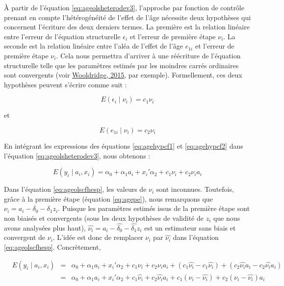 \documentclass[
]{book}
\begin{document}
À partir de l'équation \eqref{eq:ageolsheterodev3}, l'approche par fonction de contrôle prenant en compte l'hétérogénéité de l'effet de l'âge nécessite deux hypothèses qui concernent l'écriture des deux derniers termes. La première est la relation linéaire entre l'erreur de l'équation structurelle \(\epsilon_i\) et l'erreur de première étape \(\nu_i\). La seconde est la relation linéaire entre l'aléa de l'effet de l'âge \(e_{1i}\) et l'erreur de première étape \(\nu_i\). Cela nous permettra d'arriver à une réécriture de l'équation structurelle telle que les paramètres estimés par les moindres carrés ordinaires sont convergents (voir \protect\hyperlink{ref-WOO:15}{Wooldridge, 2015}, par exemple). Formellement, ces deux hypothèses peuvent s'écrire comme suit :

\begin{equation} 
\label{eq:agehypcf1}
E(\epsilon_i \mid \nu_i) = c_1 \nu_i
\end{equation}

et

\begin{equation}
\label{eq:agehypcf2}
E(e_{1i} \mid \nu_i) = c_2 \nu_i
\end{equation}

En intégrant les expressions des équations \eqref{eq:agehypcf1} et \eqref{eq:agehypcf2} dans l'équation \eqref{eq:ageolsheterodev3}, nous obtenons :

\begin{equation}
\label{eq:ageolscfhesp}
E(y_i \mid a_i, x_i) = \alpha_0 + \alpha_1 a_i + x_i' \alpha_2 + c_1 \nu_i + c_2 \nu_i a_i
\end{equation}

Dans l'équation \eqref{eq:ageolscfhesp}, les valeurs de \(\nu_i\) sont inconnues. Toutefois, grâce à la première étape (équation \ref{eq:agepe}), nous remarquons que \(\nu_i = a_i - \delta_0 - \delta_1 z_i\). Puisque les paramètres estimés issus de la première étape sont non biaisés et convergents (sous les deux hypothèses de validité de \(z_i\) que nous avons analysées plus haut), \(\hat{\nu_i} = a_i - \hat{\delta_0} - \hat{\delta_1} z_i\) est un estimateur sans biais et convergent de \(\nu_i\). L'idée est donc de remplacer \(\nu_i\) par \(\hat{\nu_i}\) dans l'équation \eqref{eq:ageolscfhesp}. Concrètement,

\begin{equation}
\label{eq:agecfhesp2}
\begin{aligned}
& E(y_i \mid a_i, x_i) &=& \alpha_0 + \alpha_1 a_i + x_i' \alpha_2 + c_1 \nu_i + c_2 \nu_i a_i
 + (c_1 \hat{\nu_i} - c_1 \hat{\nu_i})
 + (c_2 \hat{\nu_i} a_i - c_2 \hat{\nu_i} a_i) \\
& &=& \alpha_0 + \alpha_1 a_i + x_i' \alpha_2 + c_1 \hat{\nu_i} + c_2 \hat{\nu_i} a_i + c_1(\nu_i - \hat{\nu_i}) + c_2 (\nu_i - \hat{\nu_i}) a_i
\end{aligned}
\end{equation}
\end{document}
